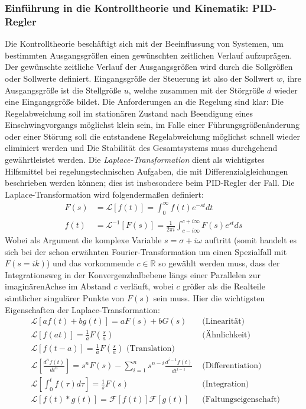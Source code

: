 \subsubsection{Einführung in die Kontrolltheorie und Kinematik: PID-Regler}
Die Kontrolltheorie beschäftigt sich mit der Beeinflussung von Systemen, um bestimmten
Ausgangsgrößen einen gewünschten zeitlichen Verlauf aufzuprägen\cite{regelungstechnik}.
Der gewünschte zeitliche Verlauf der Ausgangsgrößen wird durch die Sollgrößen oder Sollwerte
definiert. Eingangsgröße der Steuerung ist also der Sollwert $w$, ihre Ausgangsgröße ist die
Stellgröße $u$, welche zusammen mit der Störgröße $d$ wieder eine Eingangsgröße bildet. Die
Anforderungen an die Regelung sind klar: Die Regelabweichung soll im stationären Zustand
nach Beendigung
eines Einschwingvorgangs möglichst klein sein, im Falle einer Führungsgrößenänderung oder einer
Störung soll die entstandene Regelabweichung möglichst schnell wieder eliminiert werden und
Die Stabilität des Gesamtsystems muss durchgehend gewährtleistet werden.
Die \textit{Laplace-Transformation}\cite{regelungstechnik2} dient als wichtigstes Hilfsmittel
bei regelungstechnischen Aufgaben, die mit Differenzialgleichungen beschrieben werden können; dies
ist insbesondere beim PID-Regler der Fall. Die Laplace-Transformation wird folgendermaßen definiert:
\begin{align}
F(s) &= \mathcal{L}\left [f(t)\right ] = \int_{0}^{\infty}f(t)e^{-st}dt \\
f(t) &= \mathcal{L}^{-1}\left [F(s)\right ] =
\frac{1}{2\pi i} \int_{c - i\infty}^{c+ i\infty} F(s)e^{st}ds
\end{align}
Wobei als Argument die komplexe Variable $s=\sigma + i\omega$ auftritt (somit handelt es sich
bei der schon erwähnten Fourier-Transformation um einen Spezialfall mit $F(s = ik)$) und
das vorkommende $c\in \mathbb{R}$ so gewählt werden muss, dass der Integrationsweg in der
Konvergenzhalbebene längs einer Parallelen zur imaginärenAchse im Abstand $c$ verläuft, wobei
$c$ größer als die Realteile sämtlicher singulärer Punkte von $F(s)$ sein muss.
Hier die wichtigsten Eigenschaften der Laplace-Transformation:
\begin{align}
&\mathcal{L}\left [a f(t) + b g(t)\right ]
= a F(s) + b G(s)
&\mbox{ (Linearität) }\\
&\mathcal{L}\left [f(at)\right ]
= \frac{1}{a}F(\frac{s}{a})
&\mbox{ (Ähnlichkeit) }\\
&\mathcal{L}\left [f(t-a)\right ]
= \frac{1}{a}F(\frac{s}{a})
\mbox{ (Translation) }\\
&\mathcal{L}\left [\frac{d^nf(t)}{dt^n}\right ]
= s^nF(s) - \sum_{i=1}^{n}s^{n-i}\frac{d^{i-1}f(t)}{dt^{i-1}}
&\mbox{ (Differentiation) }\\
&\mathcal{L}\left [\int_{0}^{t}f(\tau)d\tau\right ]
= \frac{1}{s}F(s)
&\mbox{ (Integration) }\\
&\mathcal{L}\left [f(t) * g(t)\right ]
= \mathcal{F}\left [f(t)\right ]\mathcal{F}\left [g(t)\right ]
&\mbox{ (Faltungseigenschaft) }
\end{align}
